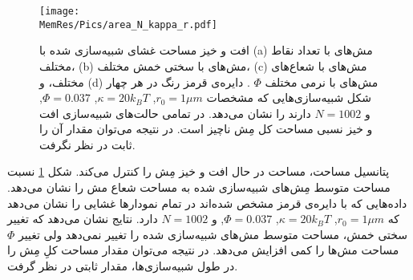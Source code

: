 \begin{figure}[htbp]
\begin{center}
\texttt{[image: \\MemRes/Pics/area\_N\_kappa\_r.pdf]}
\caption{
افت و خیز مساحت غشای شبیه‌سازی شده با 
(a)
مش‌های با تعداد نقاط مختلف، 
(b)
مش‌های با سختی خمش مختلف،
(c)
مش‌های با شعاع‌های مختلف، و
(d)
مش‌های با نرمی مختلف
$\Phi$
. دایره‌ی قرمز رنگ در هر چهار شکل شبیه‌سازی‌هایی که مشخصات 
$r_0=1\mu m$, $\kappa=20k_BT$, $\Phi=0.037$, 
 و
$N=1002$
دارند را نشان می‌دهد. در تمامی حالت‌های شبیه‌سازی افت و خیز نسبی مساحت کل مِش ناچیز است. در نتیجه‌ می‌توان مقدار آن را ثابت در نظر نگرفت. 
}
\label{fig:areaNKR}
\end{center}
\end{figure}

پتانسیل مساحت، مساحت در حال افت و خیز مِش را کنترل می‌کند.  شکل
\ref{fig:areaNKR}
نسبت مساحت متوسط مِش‌های شبیه‌سازی شده به مساحت شعاع مش را نشان می‌دهد. داده‌هایی که با دایره‌ی قرمز مشخص شده‌اند در تمام نمودارها غشایی را نشان می‌دهد که 
 $r_0=1\mu m$, $\kappa=20k_BT$, $\Phi=0.037$, 
 و
$N=1002$
دارد. نتایج نشان می‌دهد که تغییر سختی خمش، مساحت متوسط مش‌‌های شبیه‌سازی شده را تغییر نمی‌دهد ولی تغییر
$\Phi$
مساحت مش‌ها را کمی افزایش می‌دهد. در نتیجه می‌توان مقدار مساحت کلِ مِش را در طول شبیه‌سازی‌ها، مقدار ثابتی در نظر گرفت.
















